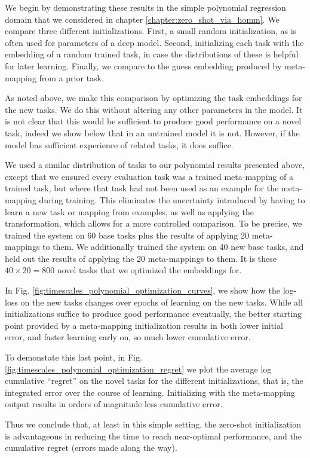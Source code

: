We begin by demonstrating these results in the simple polynomial regression domain that we considered in chapter \ref{chapter:zero_shot_via_homm}. We compare three different initializations. First, a small random initialization, as is often used for parameters of a deep model. Second, initializing each task with the embedding of a random trained task, in case the distributions of these is helpful for later learning. Finally, we compare to the guess embedding produced by meta-mapping from a prior task. \par 
As noted above, we make this comparison by optimizing the task embeddings for the new tasks. We do this without altering any other parameters in the model. It is not clear that this would be sufficient to produce good performance on a novel task, indeed we show below that in an untrained model it is not. However, if the model has sufficient experience of related tasks, it does suffice. \par 
We used a similar distribution of tasks to our polynomial results presented above, except that we ensured every evaluation task was a trained meta-mapping of a trained task, but where that task had not been used as an example for the meta-mapping during training. This eliminates the uncertainty introduced by having to learn a new task or mapping from examples, as well as applying the transformation, which allows for a more controlled comparison. To be precise, we trained the system on 60 base tasks plus the results of applying 20 meta-mappings to them. We additionally trained the system on 40 new base tasks, and held out the results of applying the 20 meta-mappings to them. It is these \(40 \times 20 = 800\) novel tasks that we optimized the embeddings for. \par 
In Fig. \ref{fig:timescales_polynomial_optimization_curves}, we show how the log-loss on the new tasks changes over epochs of learning on the new tasks. While all initializations suffice to produce good performance eventually, the better starting point provided by a meta-mapping initialization results in both lower initial error, and faster learning early on, so much lower cumulative error. \par
To demonstate this last point, in Fig. \ref{fig:timescales_polynomial_optimization_regret} we plot the average log cumulative ``regret'' on the novel tasks for the different initializations, that is, the integrated error over the course of learning. Initializing with the meta-mapping output results in orders of magnitude less cumulative error. \par
Thus we conclude that, at least in this simple setting, the zero-shot initialization is advantageous in reducing the time to reach near-optimal performance, and the cumulative regret (errors made along the way).

